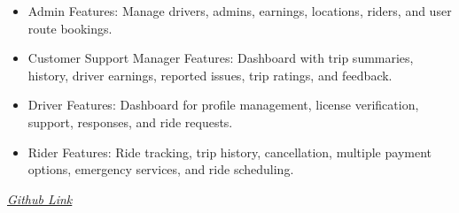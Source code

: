 \documentclass[a4paper,12pt]{article}
\begin{document}
\begin{itemize}
\begin{itemize}[label=--]
        \item Admin Features: Manage drivers, admins, earnings, locations, riders, and user route bookings.
    
        \item Customer Support Manager Features: Dashboard with trip summaries, history, driver earnings, reported issues, trip ratings, and feedback.
    
        \item Driver Features: Dashboard for profile management, license verification, support, responses, and ride requests.
    
        \item Rider Features: Ride tracking, trip history, cancellation, multiple payment options, emergency services, and ride scheduling.
        
    \end{itemize}

    \hfill \href{https://github.com/0Sa-ad0/web-tech}{\textit{Github Link}}

\end{itemize}
\end{document}
